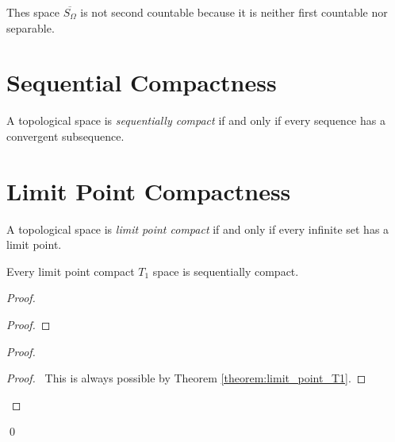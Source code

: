 \begin{example}
    Thes space $\overline{S_\Omega}$ is not second countable because it is neither
    first countable nor separable.
\end{example}

\section{Sequential Compactness}

\begin{definition}
    A topological space is \emph{sequentially compact} if and only if
    every sequence has a convergent subsequence.
\end{definition}

\section{Limit Point Compactness}

\begin{definition}
    A topological space is \emph{limit point compact} if and only if every
    infinite set has a limit point.
\end{definition}

\begin{proposition}
    \label{proposition:limit_point_compact_sequentially_compact}
    Every limit point compact $T_1$ space is sequentially compact.
\end{proposition}

\begin{proof}
    \pf
    \begin{proof}
    \end{proof}
    \begin{proof}
        \begin{proof}
            \pf\ This is always possible by Theorem \ref{theorem:limit_point_T1}.
        \end{proof}
    \end{proof}
    \qed
\end{proof}

